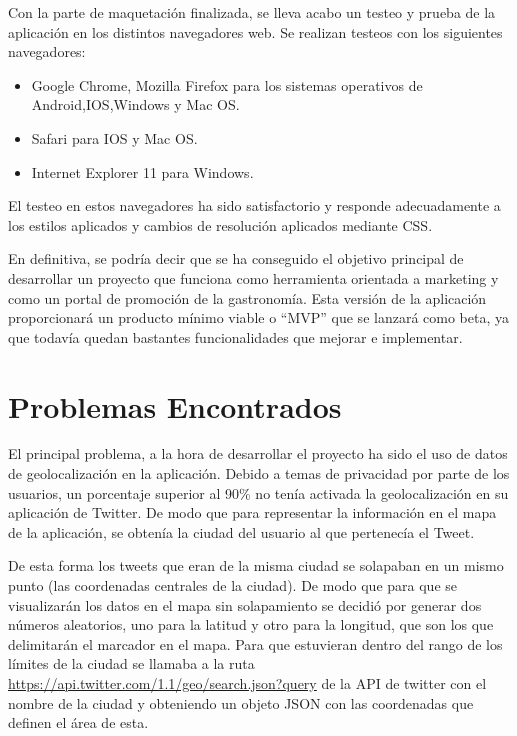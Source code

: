 Con la parte de maquetación finalizada, se lleva acabo un testeo y prueba de la aplicación en los distintos navegadores web. Se realizan testeos con los siguientes
navegadores:

\begin{itemize}
\item Google Chrome, Mozilla Firefox para los sistemas operativos de Android,IOS,Windows y Mac OS.
\item Safari para IOS y Mac OS.
\item Internet Explorer 11 para Windows.
\end{itemize}

El testeo en estos navegadores ha sido satisfactorio y responde adecuadamente a los estilos aplicados y cambios de resolución aplicados mediante CSS.

En definitiva, se podría decir que se ha conseguido el objetivo principal de desarrollar un proyecto que funciona como herramienta orientada a marketing y como un portal de promoción de la gastronomía. Esta versión de la aplicación proporcionará un producto mínimo viable o ``MVP'' que se lanzará como beta, ya que todavía quedan bastantes funcionalidades que mejorar e implementar.

\section{Problemas Encontrados}

El principal problema, a la hora de desarrollar el proyecto ha sido el uso de datos de geolocalización en la aplicación. Debido a temas de privacidad por parte de los usuarios, un porcentaje superior al 90\% no tenía activada la geolocalización en su aplicación de Twitter. De modo que para representar la información en el mapa de la aplicación, se obtenía la ciudad del usuario al que pertenecía el Tweet.

\vspace{5 mm}

De esta forma los tweets que eran de la misma ciudad se solapaban en un mismo punto (las coordenadas centrales de la ciudad). De modo que para que se visualizarán los datos en el mapa sin solapamiento se decidió por generar dos números aleatorios, uno para la latitud y otro para la longitud, que son los que delimitarán el marcador en el mapa. Para que estuvieran dentro del rango de los límites de la ciudad se llamaba a la ruta \url{https://api.twitter.com/1.1/geo/search.json?query} de la API de twitter con el nombre de la ciudad y obteniendo un objeto JSON con las coordenadas que definen el área
de esta.


